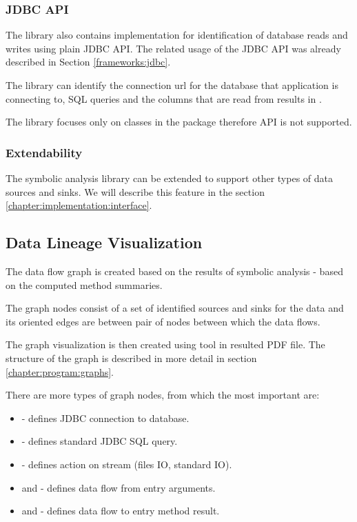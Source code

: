 \subsubsection{JDBC API}

The library also contains implementation for identification of
database reads and writes using plain JDBC API.
The related usage of the JDBC API was already described in Section \ref{frameworks:jdbc}.

The library can identify the connection url for the database
that application is connecting to, SQL queries and the columns
that are read from results in .

The library focuses only on classes in the package 
therefore  API is not supported.



\subsubsection{Extendability}

The symbolic analysis library can be extended to support other types
of data sources and sinks. We will describe this feature in the section \ref{chapter:implementation:interface}.



\subsection{Data Lineage Visualization \label{chapter:analysis:visualization}}

The data flow graph is created based on the results of symbolic analysis - based on
the computed method summaries.

The graph nodes consist of a set of identified sources and sinks for the data
and its oriented edges are between pair of nodes between which the data flows.

The graph visualization is then created using \citet{Graphviz} tool in resulted PDF file.
The structure of the graph is described in more detail in section \ref{chapter:program:graphs}.

There are more types of graph nodes, from which the most important are:
\begin{itemize}
  \item {} - defines JDBC connection to database.
  \item {} - defines standard JDBC SQL query.
  \item {} - defines action on stream (files IO, standard IO).
  \item {} and  - defines data flow from entry arguments.
  \item {} and  - defines data flow to entry method result.
\end{itemize}

